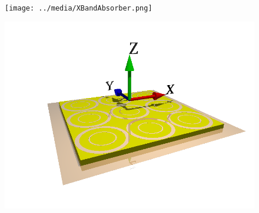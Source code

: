 \documentclass[a4paper,12pt]{scrartcl}  %
\begin{document}
\begin{figure}
\centering
\begin{minipage}[b]{0.4\textwidth}
\texttt{[image: ../media/XBandAbsorber.png]}
\end{minipage}
\hspace{50pt}
\begin{minipage}[b]{0.4\textwidth}
\includegraphics[scale=0.3]{../media/double_rings.png}
\end{minipage}
\end{figure}




\newpage



\printbibliography
\end{document}
